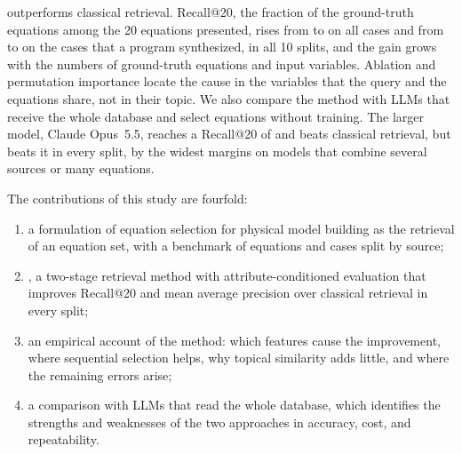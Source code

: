 \ours{} outperforms classical retrieval. Recall@20, the fraction of the ground-truth
equations among the 20 equations presented, rises from \RecABase{} to \RecAProp{} on all cases and
from \RecBBase{} to \RecBProp{} on the \NSynth{} cases that a program synthesized, in all 10 splits,
and the gain grows with the numbers of ground-truth equations and input variables. Ablation and
permutation importance locate the cause in the variables that the query and the equations share,
not in their topic.
We also compare the method with LLMs that receive the whole database and select equations without
training. The larger model, Claude Opus~5.5, reaches a Recall@20 of \RecAOpus{} and beats classical
retrieval, but \ours{} beats it in every split, by the widest margins on models that
combine several sources or many equations.

The contributions of this study are fourfold:
\begin{enumerate}
  \item a formulation of equation selection for physical model building as the retrieval of an
    equation set, with a benchmark of \NEq{} equations and \NCases{} cases split by source;
  \item \ours, a two-stage retrieval method with attribute-conditioned evaluation that improves
    Recall@20 and mean average precision over classical retrieval in every split;
  \item an empirical account of the method: which features cause the improvement, where
    sequential selection helps, why topical similarity adds little, and where the remaining errors
    arise;
  \item a comparison with LLMs that read the whole database, which identifies the strengths and
    weaknesses of the two approaches in accuracy, cost, and repeatability.
\end{enumerate}
